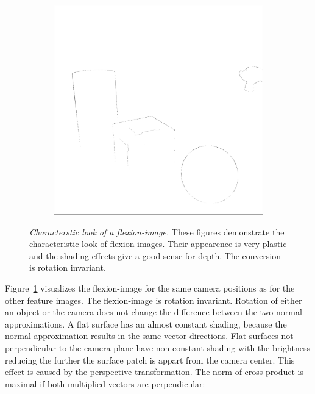 \begin{figure}[tb]
\begin{subfigure}[t]{0.32\textwidth}
    \end{subfigure}
    \begin{subfigure}[t]{0.32\textwidth}
        \includegraphics[width=\linewidth]{chapter04/img/flexion-0210.png}
    \end{subfigure}
    \caption[Characterstic look of a \gls{flexion-image}]{\emph{Characterstic look of a \gls{flexion-image}.} These figures demonstrate the characteristic look of \Glspl{flexion-image}. Their appearence is very plastic and the shading effects give a good sense for depth. The conversion is rotation invariant.}\label{fig:flexion_images}
\end{figure}
Figure~\ref{fig:flexion_images} visualizes the \Gls{flexion-image} for the same camera positions as for the other feature images.
The \gls{flexion-image} is rotation invariant.
Rotation of either an object or the camera does not change the difference between the two normal approximations.
A flat surface has an almost constant shading, because the normal approximation results in the same vector directions.
Flat surfaces not perpendicular to the camera plane have non-constant shading with the brightness reducing the further the surface patch is appart from the camera center.
This effect is caused by the perspective transformation.
The norm of cross product is maximal if both multiplied vectors are perpendicular:
